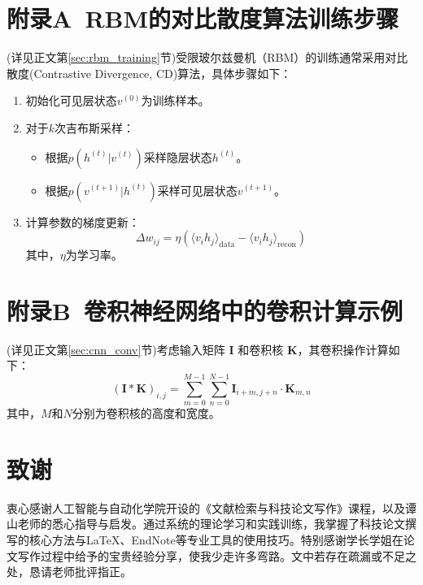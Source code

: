 \documentclass[UTF8]{article}
\begin{document}
	\section*{附录A\ RBM的对比散度算法训练步骤}
	\label{app:cd}
	(详见正文第\ref{sec:rbm_training}节)受限玻尔兹曼机（RBM）的训练通常采用对比散度(Contrastive Divergence, CD)算法，具体步骤如下：
	\begin{enumerate}
		\item 初始化可见层状态$v^{(0)}$为训练样本。
		\item 对于$k$次吉布斯采样：
		\begin{itemize}
			\item 根据$p(h^{(t)}|v^{(t)})$采样隐层状态$h^{(t)}$。
			\item 根据$p(v^{(t+1)}|h^{(t)})$采样可见层状态$v^{(t+1)}$。
		\end{itemize}
		\item 计算参数的梯度更新：
		\[
		\Delta w_{ij} = \eta \left( \langle v_i h_j \rangle_{\text{data}} - \langle v_i h_j \rangle_{\text{recon}} \right)
		\]
其中，$\eta$为学习率。
	\end{enumerate}
	
	\section*{附录B\ 卷积神经网络中的卷积计算示例}
	\label{app:conv}
	(详见正文第\ref{sec:cnn_conv}节)考虑输入矩阵 $\mathbf{I}$ 和卷积核 $\mathbf{K}$，其卷积操作计算如下：
    \[
    (\mathbf{I} * \mathbf{K})_{i,j} = \sum_{m=0}^{M-1} \sum_{n=0}^{N-1} \mathbf{I}_{i+m, j+n} \cdot \mathbf{K}_{m,n}
    \]
    其中，$M$和$N$分别为卷积核的高度和宽度。
	
	\section*{致谢}
	
衷心感谢人工智能与自动化学院开设的《文献检索与科技论文写作》课程，以及谭山老师的悉心指导与启发。通过系统的理论学习和实践训练，我掌握了科技论文撰写的核心方法与LaTeX、EndNote等专业工具的使用技巧。特别感谢学长学姐在论文写作过程中给予的宝贵经验分享，使我少走许多弯路。文中若存在疏漏或不足之处，恳请老师批评指正。
	
\end{document}
